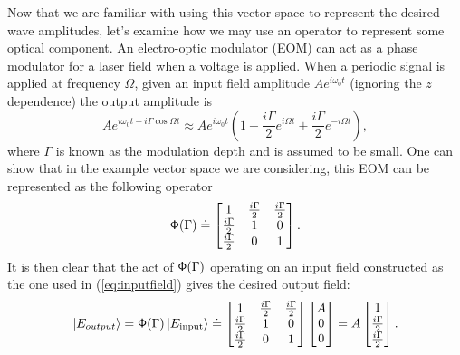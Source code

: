 Now that we are familiar with using this vector space to represent the desired wave amplitudes, let's examine how we may use an operator to represent some optical component. %
An electro-optic modulator (EOM) can act as a phase modulator for a laser field when a voltage is applied. %
When a periodic signal is applied at frequency $\Omega$, given an input field amplitude $Ae^{i\omega_0 t}$ (ignoring the $z$ dependence) the output amplitude is
\newcommand{\gammahalf}{\frac{i\Gamma}{2}}
\begin{equation}
\label{eq:inputfield}
Ae^{i\omega_0 t + i\Gamma \cos{\Omega t}}\approx Ae^{i\omega_0 t}\left(1+\gammahalf e^{i\Omega t}+\gammahalf e^{-i\Omega t}\right),
\end{equation}
where $\Gamma$ is known as the modulation depth and is assumed to be small. %
One can show that in the example vector space we are considering, this EOM can be represented as the following operator
\begin{equation}
\oper{\Phi}(\Gamma) \doteq 
\ms 
1          & \gammahalf & \gammahalf \\
\gammahalf & 1          & 0          \\
\gammahalf & 0          & 1 \\
\me.
\end{equation}
It is then clear that the act of $\mathsf{\Phi}(\Gamma)$ operating on an input field constructed as the one used in (\ref{eq:inputfield}) gives the desired output field:
\begin{equation}
\vect{E_{output}}=
\oper{\Phi}(\Gamma)\vect{E_{\text{input}}} \doteq \ms 
1          & \gammahalf & \gammahalf \\
\gammahalf & 1          & 0          \\
\gammahalf & 0          & 1 \\
\me
\ms A \\ 0 \\ 0 \me = A \ms  1 \\ \gammahalf \\ \gammahalf \me.
\end{equation}

